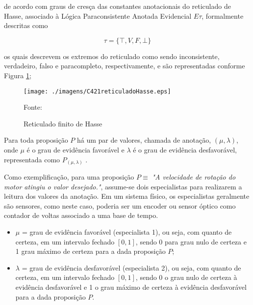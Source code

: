 de acordo com graus de cresça das constantes anotacionais do reticulado de Hasse, 
associado à Lógica Paraconsistente Anotada Evidencial $E\tau$, 
formalmente descritas como 

\begin{center}
\begin{equation}
  \tau = \{ \top , V, F, \bot \}
\end{equation}
\end{center}

os quais descrevem os extremos do reticulado como sendo 
inconsistente,%
verdadeiro, %
falso e %
paracompleto,%
respectivamente, e são representadas conforme Figura \ref{fig:reticuladoHasse}; 

\begin{figure}[!htb]
\caption{Reticulado finito de Hasse}
\center\texttt{[image: ./imagens/C421reticuladoHasse.eps]}
\label{fig:reticuladoHasse}

{\small Fonte: \cite{JoaoInacio} }
\end{figure}

Para toda proposição $P$ há um par de valores, chamada de anotação, $(\mu , \lambda )$, onde $\mu$ é o grau de evidência favorável e $\lambda $ é o grau de evidência desfavorável, representada como  $P_{( \mu , \lambda )}$ \cite{Abe2014} .

Como exemplificação, para uma proposição $P \equiv$ \emph{"A velocidade de rotação do motor atingiu o valor desejado."}, assume-se dois especialistas para realizarem a leitura dos valores da anotação. Em um sistema físico, os especialistas geralmente são sensores, como neste caso, poderia ser um encoder ou sensor óptico como contador de voltas associado a uma base de tempo.

\begin{itemize}
\item 
$\mu$ = grau de evidência favorável (especialista 1), ou seja, com quanto de certeza, em um intervalo fechado $[0,1]$, sendo 0 para grau nulo de certeza e 1 grau máximo de certeza para a dada proposição $P$;

\item
$\lambda$ = grau de evidência desfavorável (especialista 2), ou seja, com quanto de certeza, em um intervalo fechado $[0,1]$, sendo 0 o grau nulo de certeza à evidência desfavorável e 1 o grau máximo de certeza à evidência desfavorável para a dada proposição $P$.

\end{itemize}


